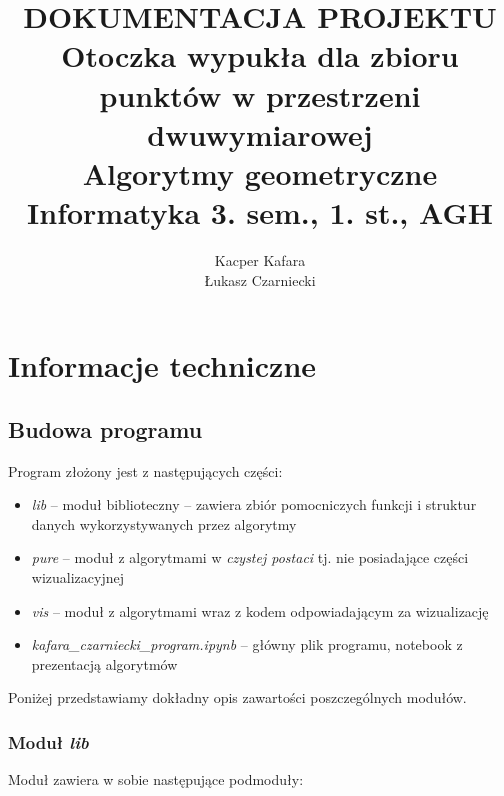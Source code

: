 \documentclass[11pt]{article}
\author{Kacper Kafara\\Łukasz Czarniecki}
\title{\textbf{DOKUMENTACJA PROJEKTU}\\\textbf{Otoczka wypukła dla zbioru punktów w przestrzeni dwuwymiarowej}\\Algorytmy geometryczne\\Informatyka 3. sem., 1. st., AGH}
\date{}
\theoremstyle{remark} \newtheorem{definition}{def.}
\theoremstyle{definition} \newtheorem{twierdzenie}{tw.}
\begin{document}
\maketitle

\newpage

\tableofcontents

\listoffigures

\listoftables

\newpage



\section{Informacje techniczne}

\subsection{Budowa programu}

Program złożony jest z następujących części:

\begin{itemize}
    \item   \emph{lib} -- moduł biblioteczny -- zawiera zbiór pomocniczych funkcji i struktur danych wykorzystywanych przez algorytmy
    \item   \emph{pure} -- moduł z algorytmami w \emph{czystej postaci} tj. nie posiadające części wizualizacyjnej
    \item   \emph{vis} -- moduł z algorytmami wraz z kodem odpowiadającym za wizualizację
    \item   \emph{kafara\_czarniecki\_program.ipynb} -- główny plik programu, notebook z prezentacją algorytmów
\end{itemize}


Poniżej przedstawiamy dokładny opis zawartości poszczególnych modułów. 

\subsubsection{Moduł \emph{lib}}

Moduł zawiera w sobie następujące podmoduły:
\end{document}
